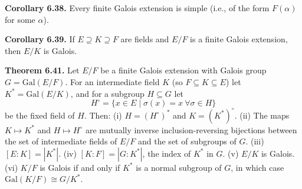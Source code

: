 \documentclass{article}
\newenvironment{theoremx}[1]{\noindent\textbf{Theorem #1.} }{\par}
\newenvironment{corollaryx}[1]{\noindent\textbf{Corollary #1.} }{\par}
\begin{document}
\begin{corollaryx}{6.38}
Every finite Galois extension is simple (i.e., of the form $F(\alpha)$ for some $\alpha$).
\end{corollaryx}

\begin{corollaryx}{6.39}
If $E\supseteq K\supseteq F$ are fields and $E/F$ is a finite Galois extension, then $E/K$ is Galois.
\end{corollaryx}

\begin{theoremx}{6.41}
Let $E/F$ be a finite Galois extension with Galois group $G=\mathrm{Gal}(E/F)$.  For an intermediate field $K$ (so $F\subseteq K\subseteq E$) let $K^* = \mathrm{Gal}(E/K)$, and for a subgroup $H\subseteq G$ let 
\[
  H^\circ = \{x\in E \mid \sigma(x)=x\ \forall\sigma\in H\}
\]
be the fixed field of $H$.  Then:
(i) $H = (H^\circ)^*$ and $K = (K^*)^\circ$.
(ii) The maps $K\mapsto K^*$ and $H\mapsto H^\circ$ are mutually inverse inclusion-reversing bijections between the set of intermediate fields of $E/F$ and the set of subgroups of $G$.
(iii) $[E:K] = |K^*|$.
(iv) $[K:F] = |G:K^*|$, the index of $K^*$ in $G$.
(v) $E/K$ is Galois.
(vi) $K/F$ is Galois if and only if $K^*$ is a normal subgroup of $G$, in which case $\mathrm{Gal}(K/F)\cong G/K^*$.
\end{theoremx}
\end{document}
